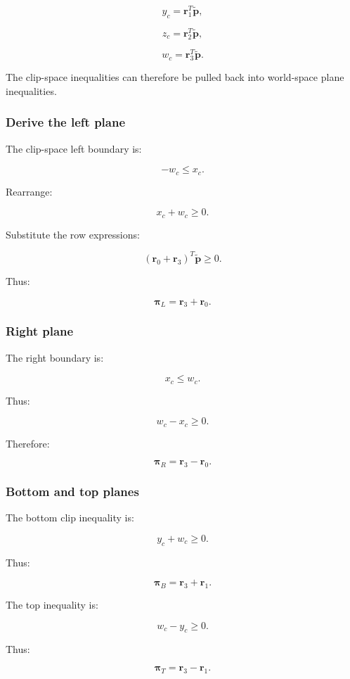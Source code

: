 \[
 y_c=\mathbf r_1^T\tilde{\mathbf p},
\]

\[
 z_c=\mathbf r_2^T\tilde{\mathbf p},
\]

\[
 w_c=\mathbf r_3^T\tilde{\mathbf p}.
\]

The clip-space inequalities can therefore be pulled back into world-space plane inequalities.

\subsubsection{Derive the left plane}\label{derive-the-left-plane}

The clip-space left boundary is:

\[
 -w_c\le x_c.
\]

Rearrange:

\[
 x_c+w_c\ge0.
\]

Substitute the row expressions:

\[
 (\mathbf r_0+\mathbf r_3)^T\tilde{\mathbf p}\ge0.
\]

Thus:

\[
 \boxed{ \boldsymbol\pi_L=\mathbf r_3+\mathbf r_0 }.
\]

\subsubsection{Right plane}\label{right-plane}

The right boundary is:

\[
 x_c\le w_c.
\]

Thus:

\[
 w_c-x_c\ge0.
\]

Therefore:

\[
 \boxed{ \boldsymbol\pi_R=\mathbf r_3-\mathbf r_0 }.
\]

\subsubsection{Bottom and top planes}\label{bottom-and-top-planes}

The bottom clip inequality is:

\[
 y_c+w_c\ge0.
\]

Thus:

\[
 \boxed{ \boldsymbol\pi_B=\mathbf r_3+\mathbf r_1 }.
\]

The top inequality is:

\[
 w_c-y_c\ge0.
\]

Thus:

\[
 \boxed{ \boldsymbol\pi_T=\mathbf r_3-\mathbf r_1 }.
\]


